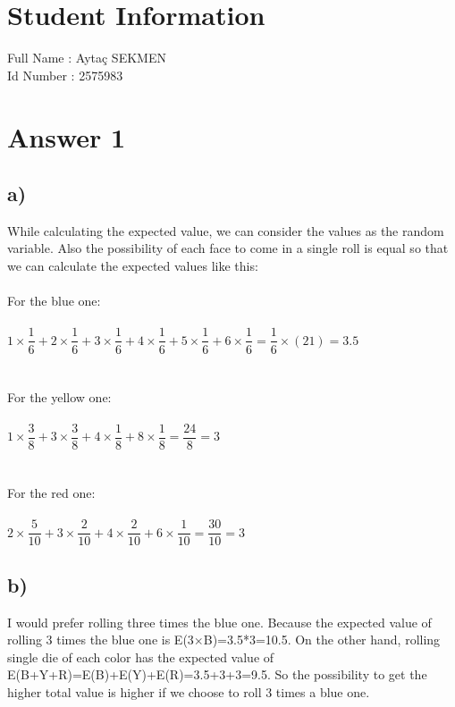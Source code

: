 \documentclass[12pt]{article}
\begin{document}
\section*{Student Information } 
Full Name :  Aytaç SEKMEN\\
Id Number :  2575983\\

\section*{Answer 1}

\subsection*{a)} 
While calculating the expected value, we can consider the values as the random variable. Also the possibility of each face to come in a single roll is equal so that we can calculate the expected values like this:\\\\For the blue one:\\\\$1\times\dfrac{1}{6}+2\times\dfrac{1}{6}+3\times\dfrac{1}{6}+4\times\dfrac{1}{6}+5\times\dfrac{1}{6}+6\times\dfrac{1}{6}=\dfrac{1}{6}\times(21)=3.5$\\\\\\
For the yellow one:\\\\$1\times\dfrac{3}{8}+3\times\dfrac{3}{8}+4\times\dfrac{1}{8}+8\times\dfrac{1}{8}=\dfrac{24}{8}=3$\\\\\\
For the red one:\\\\$2\times\dfrac{5}{10}+3\times\dfrac{2}{10}+4\times\dfrac{2}{10}+6\times\dfrac{1}{10}=\dfrac{30}{10}=3$



\subsection*{b)} 
I would prefer rolling three times the blue one. Because the expected value of rolling 3 times the blue one is E(3$\times$B)=3.5*3=10.5. On the other hand, rolling single die of each color has the expected value of E(B+Y+R)=E(B)+E(Y)+E(R)=3.5+3+3=9.5. So the possibility to get the higher total value is higher if we choose to roll 3 times a blue one.
\end{document}
